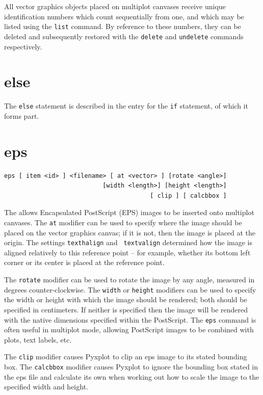 All vector graphics objects placed on multiplot canvases receive unique
identification numbers which count sequentially from one, and which may be
listed using the {\tt list} command.  By reference to these numbers, they can
be deleted and subsequently restored with the {\tt delete} and {\tt undelete}
commands respectively.


\section{else}

The {\tt else} statement is described in the entry for the {\tt if}
statement, of which it forms part.


\section{eps}

\begin{verbatim}
eps [ item <id> ] <filename> [ at <vector> ] [rotate <angle>]
                           [width <length>] [height <length>]
                                        [ clip ] [ calcbbox ]
\end{verbatim}

The  allows Encapsulated PostScript (EPS) images to be inserted
onto multiplot canvases.  The {\tt at} modifier can be used to specify where
the image should be placed on the vector graphics canvas; if it is not, then
the image is placed at the origin. The settings {\tt texthalign} and {\tt
textvalign} determined how the image is aligned relatively to this reference
point -- for example, whether its bottom left corner or its center is placed at
the reference point.

The {\tt rotate} modifier can be used to rotate the image by any angle,
measured in degrees counter-clockwise.  The {\tt width} or {\tt height}
modifiers can be used to specify the width or height with which the image
should be rendered; both should be specified in centimeters. If neither is
specified then the image will be rendered with the native dimensions specified
within the PostScript.  The {\tt eps} command is often useful in multiplot
mode, allowing PostScript images to be combined with plots, text labels, etc.

The {\tt clip} modifier causes Pyxplot to clip an eps image to its stated
bounding box. The {\tt calcbbox} modifier causes Pyxplot to ignore the bounding
box stated in the eps file and calculate its own when working out how to scale
the image to the specified width and height.


